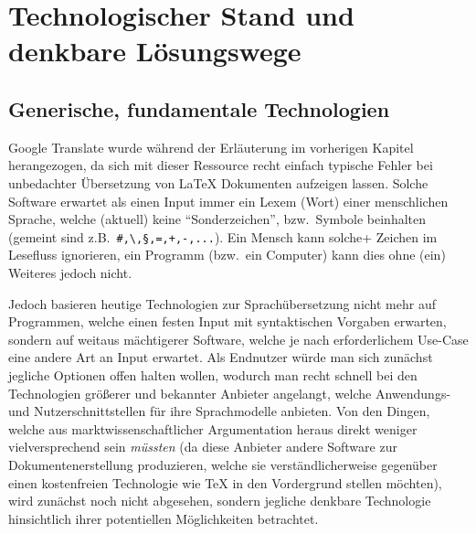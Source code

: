 \section{Technologischer Stand und denkbare Lösungswege} %

\subsection{Generische, fundamentale Technologien} %
Google Translate wurde während der Erläuterung im vorherigen Kapitel herangezogen, da sich mit dieser Ressource recht einfach typische Fehler bei unbedachter Übersetzung von \LaTeX{} Dokumenten aufzeigen lassen. Solche Software erwartet als einen Input immer ein Lexem (Wort) einer menschlichen Sprache, welche (aktuell) keine \enquote{Sonderzeichen}, bzw.\ Symbole beinhalten (gemeint sind z.B.\ \verb|#,\,§,=,+,-,...|). Ein Mensch kann solche+ Zeichen im Lesefluss ignorieren, ein Programm (bzw.\ ein Computer) kann dies ohne (ein) Weiteres jedoch nicht.%

Jedoch basieren heutige Technologien zur Sprachübersetzung nicht mehr auf Programmen, welche einen festen Input mit syntaktischen Vorgaben erwarten, sondern auf weitaus mächtigerer Software, welche je nach erforderlichem Use-Case eine andere Art an Input erwartet. Als Endnutzer würde man sich zunächst jegliche Optionen offen halten wollen, wodurch man recht schnell bei den Technologien größerer und bekannter Anbieter angelangt, welche Anwendungs- und Nutzerschnittstellen für ihre Sprachmodelle anbieten. Von den Dingen, welche aus marktwissenschaftlicher Argumentation heraus direkt weniger vielversprechend sein \textit{müssten} (da diese Anbieter andere Software zur Dokumentenerstellung produzieren, welche sie verständlicherweise gegenüber einen kostenfreien Technologie wie \TeX{} in den Vordergrund stellen möchten), wird zunächst noch nicht abgesehen, sondern jegliche denkbare Technologie hinsichtlich ihrer potentiellen Möglichkeiten betrachtet. 


